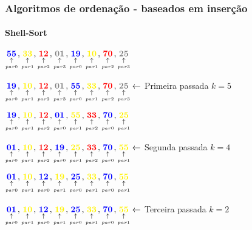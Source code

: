\begin{frame}
	\frametitle{Algoritmos de ordenação - baseados em inserção}
	\framesubtitle{Shell-Sort}
	\par $
	\apontar{par0}{\textcolor{blue}{55}}, 
	\apontar{par1}{\textcolor{yellow}{33}}, 
	\apontar{par2}{\textcolor{red}{12}},  
	\apontar{par3}{\textcolor{gray}{01}}, 
	\apontar{par0}{\textcolor{blue}{19}}, 
	\apontar{par1}{\textcolor{yellow}{10}},
	\apontar{par2}{\textcolor{red}{70}}, 
	\apontar{par3}{\textcolor{gray}{25}}
	$ \newline
	\par $
	\apontar{par0}{\textcolor{blue}{19}}, 
	\apontar{par1}{\textcolor{yellow}{10}}, 
	\apontar{par2}{\textcolor{red}{12}},  
	\apontar{par3}{\textcolor{gray}{01}}, 
	\apontar{par0}{\textcolor{blue}{55}}, 
	\apontar{par1}{\textcolor{yellow}{33}},
	\apontar{par2}{\textcolor{red}{70}}, 
	\apontar{par3}{\textcolor{gray}{25}}
	\leftarrow $ Primeira passada $k=5$ \newline
	\pause
	\par $
	\apontar{par0}{\textcolor{blue}{19}}, 
	\apontar{par1}{\textcolor{yellow}{10}}, 
	\apontar{par2}{\textcolor{red}{12}},  
	\apontar{par0}{\textcolor{blue}{01}}, 
	\apontar{par1}{\textcolor{yellow}{55}}, 
	\apontar{par2}{\textcolor{red}{33}},
	\apontar{par0}{\textcolor{blue}{70}}, 
	\apontar{par1}{\textcolor{yellow}{25}}
	$ \newline
	
	\par $
	\apontar{par0}{\textcolor{blue}{01}}, 
	\apontar{par1}{\textcolor{yellow}{10}}, 
	\apontar{par2}{\textcolor{red}{12}},  
	\apontar{par0}{\textcolor{blue}{19}}, 
	\apontar{par1}{\textcolor{yellow}{25}}, 
	\apontar{par2}{\textcolor{red}{33}},
	\apontar{par0}{\textcolor{blue}{70}}, 
	\apontar{par1}{\textcolor{yellow}{55}}
	\leftarrow$ Segunda passada $k=4$ \newline
	\pause
	\par $
	\apontar{par0}{\textcolor{blue}{01}}, 
	\apontar{par1}{\textcolor{yellow}{10}}, 
	\apontar{par0}{\textcolor{blue}{12}},  
	\apontar{par1}{\textcolor{yellow}{19}}, 
	\apontar{par0}{\textcolor{blue}{25}}, 
	\apontar{par1}{\textcolor{yellow}{33}},
	\apontar{par0}{\textcolor{blue}{70}}, 
	\apontar{par1}{\textcolor{yellow}{55}}
	$ \newline
	
	\par $
	\apontar{par0}{\textcolor{blue}{01}}, 
	\apontar{par1}{\textcolor{yellow}{10}}, 
	\apontar{par0}{\textcolor{blue}{12}},  
	\apontar{par1}{\textcolor{yellow}{19}}, 
	\apontar{par0}{\textcolor{blue}{25}}, 
	\apontar{par1}{\textcolor{yellow}{33}},
	\apontar{par0}{\textcolor{blue}{70}}, 
	\apontar{par1}{\textcolor{yellow}{55}}
	\leftarrow$ Terceira passada $k=2$
\end{frame}

